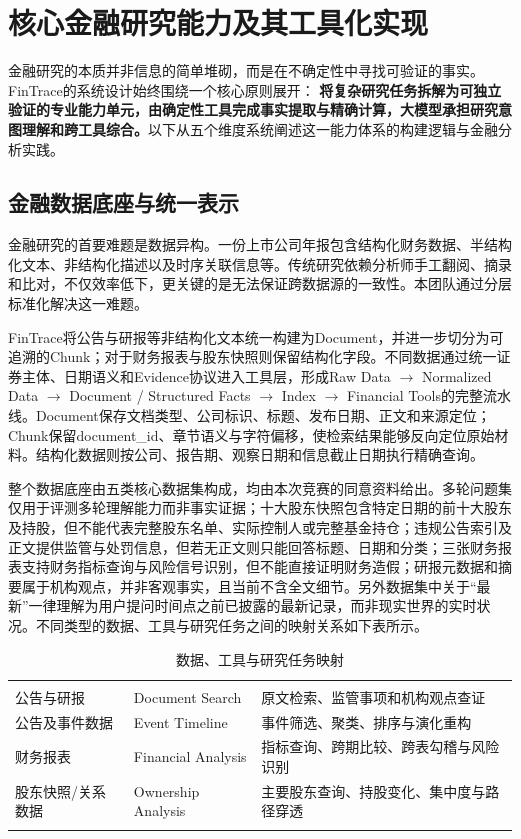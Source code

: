 \section{核心金融研究能力及其工具化实现}
\label{sec:financial_research}

金融研究的本质并非信息的简单堆砌，而是在不确定性中寻找可验证的事实。FinTrace的系统设计始终围绕一个核心原则展开：\textbf{
将复杂研究任务拆解为可独立验证的专业能力单元，由确定性工具完成事实提取与精确计算，大模型承担研究意图理解和跨工具综合。}以下从五个维度系统阐述这一能力体系的构建逻辑与金融分析实践。

\subsection{金融数据底座与统一表示}

金融研究的首要难题是数据异构。一份上市公司年报包含结构化财务数据、半结构化文本、非结构化描述以及时序关联信息等。传统研究依赖分析师手工翻阅、摘录和比对，不仅效率低下，更关键的是无法保证跨数据源的一致性。本团队通过分层标准化解决这一难题。

FinTrace将公告与研报等非结构化文本统一构建为Document，并进一步切分为可追溯的Chunk；对于财务报表与股东快照则保留结构化字段。不同数据通过统一证券主体、日期语义和Evidence协议进入工具层，形成Raw Data  $\rightarrow$  Normalized Data  $\rightarrow$  Document / Structured Facts  $\rightarrow$  Index  $\rightarrow$  Financial Tools的完整流水线。Document保存文档类型、公司标识、标题、发布日期、正文和来源定位；Chunk保留document\_id、章节语义与字符偏移，使检索结果能够反向定位原始材料。结构化数据则按公司、报告期、观察日期和信息截止日期执行精确查询。

整个数据底座由五类核心数据集构成，均由本次竞赛的同意资料给出。多轮问题集仅用于评测多轮理解能力而非事实证据；十大股东快照包含特定日期的前十大股东及持股，但不能代表完整股东名单、实际控制人或完整基金持仓；违规公告索引及正文提供监管与处罚信息，但若无正文则只能回答标题、日期和分类；三张财务报表支持财务指标查询与风险信号识别，但不能直接证明财务造假；研报元数据和摘要属于机构观点，并非客观事实，且当前不含全文细节。另外数据集中关于“最新”一律理解为用户提问时间点之前已披露的最新记录，而非现实世界的实时状况。不同类型的数据、工具与研究任务之间的映射关系如下表所示。

\begin{table}[htbp]
  \centering
  \caption{数据、工具与研究任务映射}
  \label{tab:financial_research_1}
  \begin{tabular}{C{.18\textwidth}C{.27\textwidth}C{.45\textwidth}}
    \fintracetoprule
     &  &  \\
    \fintracemidrule
    公告与研报 & Document Search & 原文检索、监管事项和机构观点查证 \\
    公告及事件数据 & Event Timeline & 事件筛选、聚类、排序与演化重构 \\
    财务报表 & Financial Analysis & 指标查询、跨期比较、跨表勾稽与风险识别 \\
    股东快照/关系数据 & Ownership Analysis & 主要股东查询、持股变化、集中度与路径穿透 \\
    \fintracebottomrule
  \end{tabular}
\end{table}

